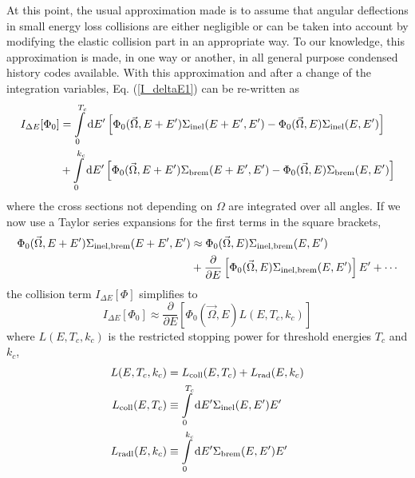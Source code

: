 At this point, the usual approximation made is to assume 
that angular deflections in small energy loss collisions are 
either negligible 
or can be taken into account by modifying the 
elastic collision part in an appropriate way. To our knowledge, 
this approximation is made, in one way or another, in all 
general purpose condensed history codes available. 
With this approximation and after a change of the integration variables, 
Eq. (\ref{I_deltaE1}) can be re-written as
\begin{equation}
\begin{split}
\label{I_deltaE2}
I_{\Delta E}[\Phi_0] & =  
\int\limits_0^{T_c} {\rm d}E' \left[ \Phi_0(\vec{\Omega},E+E') 
\Sigma_{\rm inel}(E+E',E') - \Phi_0(\vec{\Omega},E) \Sigma_{\rm inel}(E,E') 
\right] \\ 
& +  
\int\limits_0^{k_c} {\rm d}E'  \left[ \Phi_0(\vec{\Omega},E+E') 
\Sigma_{\rm brem}(E+E',E') - \Phi_0(\vec{\Omega},E) \Sigma_{\rm brem}(E,E')
\right]
\end{split}
\end{equation}
where the cross sections not depending on $\Omega$ are integrated 
over all angles. 
If we now use a Taylor series expansions for the first terms in 
the square brackets,
\begin{equation}
\label{taylor_exp}
\begin{split}
\Phi_0(\vec{\Omega},E+E') \Sigma_{\rm inel,brem}(E+E',E') & \approx 
\Phi_0(\vec{\Omega},E) \Sigma_{\rm inel,brem}(E,E') \\
& + 
\frac{\partial}{\partial E} \left[ 
\Phi_0(\vec{\Omega},E) \Sigma_{\rm inel,brem}(E,E') \right] E' + \cdots
\end{split}
\end{equation}
the collision term $I_{\Delta E}[\Phi]$ simplifies to
\begin{equation}
I_{\Delta E}[\Phi_0] \approx \frac{\partial}{\partial E} \left[
\Phi_0(\vec{\Omega},E) L(E,T_c,k_c) \right]
\end{equation}
where $L(E,T_c,k_c)$ is the restricted stopping power 
for threshold energies $T_c$ and $k_c$,
\begin{equation}
\begin{split}
L(E,T_c,k_c) & = L_{\rm coll}(E,T_c) + L_{\rm rad}(E,k_c)  \\
L_{\rm coll}(E,T_c) & \equiv \int\limits_0^{T_c} {\rm d}E' 
\Sigma_{\rm inel}(E,E') E' \\
L_{\rm radl}(E,k_c) & \equiv \int\limits_0^{k_c} {\rm d}E' 
\Sigma_{\rm brem}(E,E') E' 
\end{split}
\end{equation}


